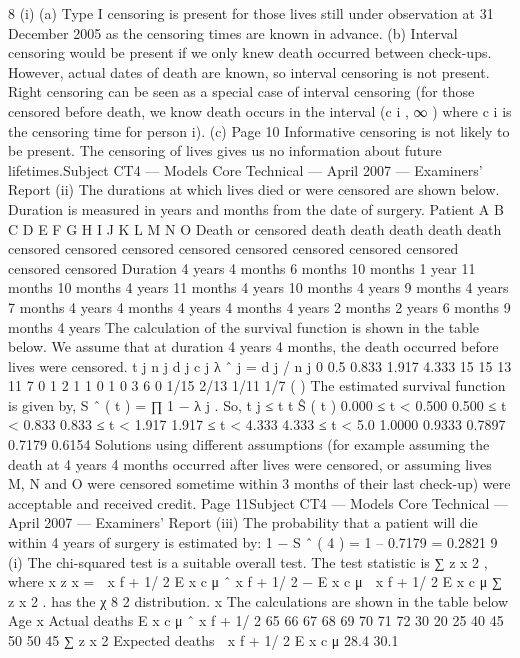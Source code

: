 \documentclass[a4paper,12pt]{article}
\begin{document}
\begin{enumerate}
8
(i)
(a) Type I censoring is present for those lives still under observation at 31
December 2005 as the censoring times are known in advance.
(b) Interval censoring would be present if we only knew death occurred
between check-ups. However, actual dates of death are known, so
interval censoring is not present.
Right censoring can be seen as a special case of interval censoring (for
those censored before death, we know death occurs in the interval (c i ,
∞ ) where c i is the censoring time for person i).
(c)
Page 10
Informative censoring is not likely to be present. The censoring of
lives gives us no information about future lifetimes.Subject CT4 — Models Core Technical — April 2007 — Examiners’ Report
(ii)
The durations at which lives died or were censored are shown below. Duration
is measured in years and months from the date of surgery.
Patient
A
B
C
D
E
F
G
H
I
J
K
L
M
N
O
Death or censored
death
death
death
death
death
censored
censored
censored
censored
censored
censored
censored
censored
censored
censored
Duration
4 years 4 months
6 months
10 months
1 year 11 months
10 months
4 years 11 months
4 years 10 months
4 years 9 months
4 years 7 months
4 years 4 months
4 years 4 months
4 years 2 months
2 years 6 months
9 months
4 years
The calculation of the survival function is shown in the table below. We
assume that at duration 4 years 4 months, the death occurred before lives were
censored.
t j n j d j c j λ ˆ j = d j / n j
0
0.5
0.833
1.917
4.333 15
15
13
11
7 0
1
2
1
1 0
1
0
3
6 0
1/15
2/13
1/11
1/7
(
)
The estimated survival function is given by, S ˆ ( t ) = ∏ 1 − λ j . So,
t j ≤ t
t Ŝ ( t )
0.000 ≤ t < 0.500
0.500 ≤ t < 0.833
0.833 ≤ t < 1.917
1.917 ≤ t < 4.333
4.333 ≤ t < 5.0 1.0000
0.9333
0.7897
0.7179
0.6154
Solutions using different assumptions (for example assuming the death at 4
years 4 months occurred after lives were censored, or assuming lives M, N
and O were censored sometime within 3 months of their last check-up) were
acceptable and received credit.
Page 11Subject CT4 — Models Core Technical — April 2007 — Examiners’ Report
(iii)
The probability that a patient will die within 4 years of surgery is estimated
by:
1 − S ˆ ( 4 ) = 1 – 0.7179
= 0.2821
9
(i)
The chi-squared test is a suitable overall test.
The test statistic is
∑ z x 2 , where
x
z x =
 x f + 1/ 2
E x c μ ˆ x f + 1/ 2 − E x c μ
 x f + 1/ 2
E x c μ
∑ z x 2
.
has the χ 8 2 distribution.
x
The calculations are shown in the table below
Age
x Actual
deaths
E x c μ ˆ x f + 1/ 2
65
66
67
68
69
70
71
72 30
20
25
40
45
50
50
45
∑ z x 2
Expected
deaths
 x f + 1/ 2
E x c μ
28.4
30.1

\end{enumerate}
\end{document}
